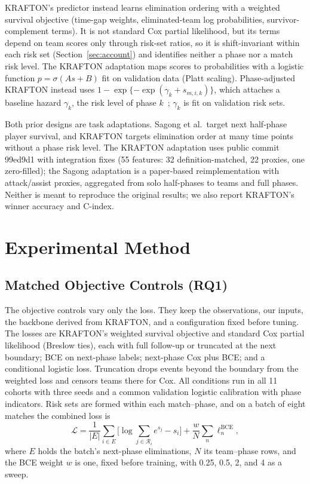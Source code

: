 \documentclass[sigconf,anonymous]{acmart}
\begin{document}
KRAFTON's predictor instead learns elimination ordering with a weighted survival objective (time-gap weights, eliminated-team log probabilities, survivor-complement terms). It is not standard Cox partial likelihood, but its terms depend on team scores only through risk-set ratios, so it is shift-invariant within each risk set (Section~\ref{sec:account}) and identifies neither a phase nor a match risk level. The KRAFTON adaptation maps scores to probabilities with a logistic function $p=\sigma(A s+B)$ fit on validation data (Platt scaling). Phase-adjusted KRAFTON instead uses $1-\exp\{-\exp(\gamma_k+s_{m,i,k})\}$, which attaches a baseline hazard $\gamma_k$, the risk level of phase $k$~\cite{PrenticeGloeckler78}; $\gamma_k$ is fit on validation risk sets.

Both prior designs are task adaptations. Sagong et al.\ target next half-phase player survival, and KRAFTON targets elimination order at many time points without a phase risk level. The KRAFTON adaptation uses public commit 99ed9d1 with integration fixes (55 features: 32 definition-matched, 22 proxies, one zero-filled); the Sagong adaptation is a paper-based reimplementation with attack/assist proxies, aggregated from solo half-phases to teams and full phases. Neither is meant to reproduce the original results; we also report KRAFTON's winner accuracy and C-index.

\section{Experimental Method}
\label{sec:method:evaluation}
\subsection{Matched Objective Controls (RQ1)}
\label{sec:method:decomposition}
The objective controls vary only the loss. They keep the observations, our inputs, the backbone derived from KRAFTON, and a configuration fixed before tuning. The losses are KRAFTON's weighted survival objective and standard Cox partial likelihood (Breslow ties), each with full follow-up or truncated at the next boundary; BCE on next-phase labels; next-phase Cox plus BCE; and a conditional logistic loss. Truncation drops events beyond the boundary from the weighted loss and censors teams there for Cox. All conditions run in all 11 cohorts with three seeds and a common validation logistic calibration with phase indicators. Risk sets are formed within each match--phase, and on a batch of eight matches the combined loss is
\begin{equation}
\mathcal{L}=\frac{1}{|E|}\sum_{i\in E}\Big[\log\sum_{j\in\mathcal{R}_i}e^{s_j}-s_i\Big]+\frac{w}{N}\sum_{n}\ell^{\mathrm{BCE}}_n,
\label{eq:combined}
\end{equation}
where $E$ holds the batch's next-phase eliminations, $N$ its team--phase rows, and the BCE weight $w$ is one, fixed before training, with 0.25, 0.5, 2, and 4 as a sweep.
\end{document}
